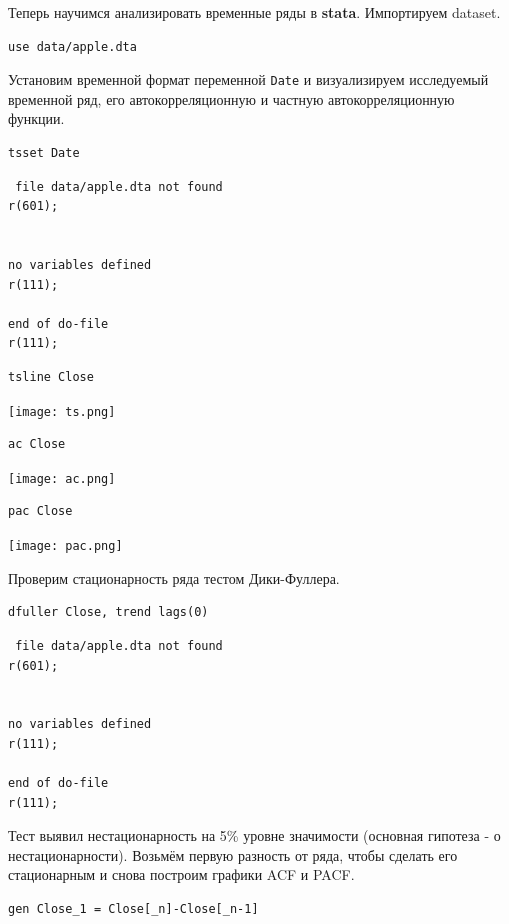 \documentclass[]{book}
\begin{document}
Теперь научимся анализировать временные ряды в \textbf{stata}.
Импортируем dataset.

\begin{verbatim}
use data/apple.dta
\end{verbatim}

Установим временной формат переменной \texttt{Date} и визуализируем исследуемый временной ряд, его автокорреляционную и частную автокорреляционную функции.

\begin{verbatim}
tsset Date
\end{verbatim}

\begin{verbatim}
 file data/apple.dta not found
r(601);


no variables defined
r(111);

end of do-file
r(111);
\end{verbatim}

\begin{verbatim}
tsline Close
\end{verbatim}

\texttt{[image: ts.png]}

\begin{verbatim}
ac Close
\end{verbatim}

\texttt{[image: ac.png]}

\begin{verbatim}
pac Close
\end{verbatim}

\texttt{[image: pac.png]}

Проверим стационарность ряда тестом Дики-Фуллера.

\begin{verbatim}
dfuller Close, trend lags(0)
\end{verbatim}

\begin{verbatim}
 file data/apple.dta not found
r(601);


no variables defined
r(111);

end of do-file
r(111);
\end{verbatim}

Тест выявил нестационарность на 5\% уровне значимости (основная гипотеза - о нестационарности).
Возьмём первую разность от ряда, чтобы сделать его стационарным и снова построим графики ACF и PACF.

\begin{verbatim}
gen Close_1 = Close[_n]-Close[_n-1]
\end{verbatim}
\end{document}
